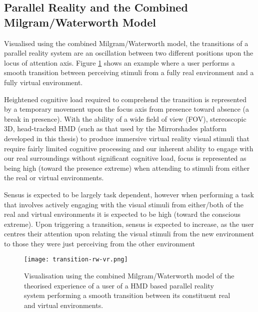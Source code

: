 \subsection{Parallel Reality and the Combined Milgram/Waterworth Model}
Visualised using the combined Milgram/Waterworth model, the transitions of a parallel reality system are an oscillation between two different positions upon the locus of attention axis. Figure \ref{focus-locus-sensus-with-virtuality-continuum-with-transition} shows an example where a user performs a smooth transition between perceiving stimuli from a fully real environment and a fully virtual environment.

Heightened cognitive load required to comprehend the transition is represented by a temporary movement upon the focus axis from presence toward absence (a break in presence). With the ability of a wide field of view (FOV), stereoscopic 3D, head-tracked HMD (such as that used by the Mirrorshades platform developed in this thesis) to produce immersive virtual reality visual stimuli that require fairly limited cognitive processing and our inherent ability to engage with our real surroundings without significant cognitive load, focus is represented as being high (toward the presence extreme) when attending to stimuli from either the real or virtual environments.

Sensus is expected to be largely task dependent, however when performing a task that involves actively engaging with the visual stimuli from either/both of the real and virtual environments it is expected to be high (toward the conscious extreme). Upon triggering a transition, sensus is expected to increase, as the user centres their attention upon relating the visual stimuli from the new environment to those they were just perceiving from the other environment



\begin{figure}[h]
	\begin{center}
		\texttt{[image: transition-rw-vr.png]}
		\caption{Visualisation using the combined Milgram/Waterworth model of the theorised experience of a user of a HMD based parallel reality system performing a smooth transition between its constituent real and virtual environments.}
		\label{focus-locus-sensus-with-virtuality-continuum-with-transition}
	\end{center}	
\end{figure}

